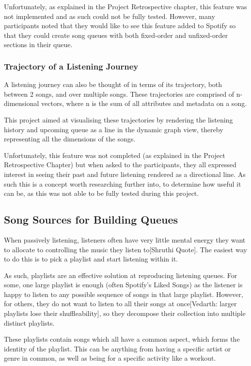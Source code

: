 Unfortunately, as explained in the Project Retrospective chapter, this feature was not implemented and as such could not be fully tested. However, many participants noted that they would like to see this feature added to Spotify so that they could create song queues with both fixed-order and unfixed-order sections in their queue.

\subsubsection{Trajectory of a Listening Journey}
A listening journey can also be thought of in terms of its trajectory, both between 2 songs, and over multiple songs. These trajectories are comprised of n-dimensional vectors, where n is the sum of all attributes and metadata on a song.

This project aimed at visualising these trajectories by rendering the listening history and upcoming queue as a line in the dynamic graph view, thereby representing all the dimensions of the songs.

Unfortunately, this feature was not completed (as explained in the Project Retrospective Chapter) but when asked to the participants, they all expressed interest in seeing their past and future listening rendered as a directional line. As such this is a concept worth researching further into, to determine how useful it can be, as this was not able to be fully tested during this project.

\subsection{Song Sources for Building Queues}%
When passively listening, listeners often have very little mental energy they want to allocate to controlling the music they listen to[Shruthi Quote]. The easiest way to do this is to pick a playlist and start listening within it.

As such, playlists are an effective solution at reproducing listening queues. For some, one large playlist is enough (often Spotify's Liked Songs) as the listener is happy to listen to any possible sequence of songs in that large playlist. However, for others, they do not want to listen to all their songs at once[Vedarth: larger playlists lose their shuffleability], so they decompose their collection into multiple distinct playlists.

These playlists contain songs which all have a common aspect, which forms the identity of the playlist. This can be anything from having a specific artist or genre in common, as well as being for a specific activity like a workout.

